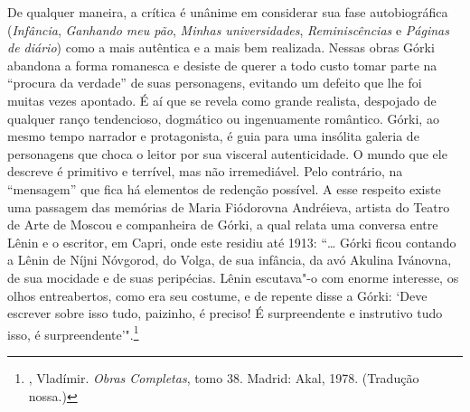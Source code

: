 De qualquer maneira, a crítica é unânime em considerar sua fase
autobiográfica (\emph{Infância}, \emph{Ganhando meu pão},
\emph{Minhas universidades}, \emph{Reminiscências} e \emph{Páginas
de diário}) como a mais autêntica e a mais bem realizada. Nessas
obras Górki abandona a forma romanesca e desiste de querer a todo
custo tomar parte na ``procura da verdade'' de suas personagens,
evitando um defeito que lhe foi muitas vezes apontado. É aí que
se revela como grande realista, despojado de qualquer ranço
tendencioso, dogmático ou ingenuamente romântico. Górki, ao mesmo
tempo narrador e protagonista, é guia para uma insólita galeria
de personagens que choca o leitor por sua visceral autenticidade.
O mundo que ele descreve é primitivo e terrível, mas não
irremediável. Pelo contrário, na ``mensagem'' que fica há
elementos de redenção possível. A esse respeito existe uma
passagem das memórias de Maria Fiódorovna Andréieva, artista do
Teatro de Arte de Moscou e companheira de Górki, a qual relata
uma conversa entre Lênin e o escritor, em Capri, onde este
residiu até 1913: ``\ldots{} Górki ficou contando a Lênin de
Níjni Nóvgorod, do Volga, de sua infância, da avó Akulina
Ivánovna, de sua mocidade e de suas peripécias. Lênin escutava"-o
com enorme interesse, os olhos entreabertos, como era seu costume,
e de repente disse a Górki: `Deve escrever sobre isso tudo,
paizinho, é preciso! É surpreendente e instrutivo tudo isso, é
surpreendente'".\footnote{, Vladímir. \emph{Obras
Completas}, tomo 38. Madrid: Akal, 1978. (Tradução nossa.)}

